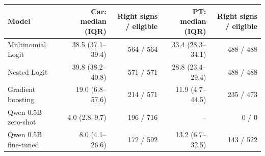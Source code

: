 \begin{tabular}{lrrrr}
\toprule
Model & Car: median (IQR) & Right signs / eligible & PT: median (IQR) & Right signs / eligible \\
\midrule
Multinomial Logit & 38.5 (37.1--39.4) & 564 / 564 & 33.4 (28.3--34.1) & 488 / 488 \\
Nested Logit & 39.8 (38.2--40.8) & 571 / 571 & 28.8 (23.4--29.4) & 488 / 488 \\
Gradient boosting & 19.0 (6.8--57.6) & 214 / 571 & 11.9 (4.7--44.5) & 235 / 473 \\
Qwen 0.5B zero-shot & 4.0 (2.8--9.7) & 196 / 716 & -- & 0 / 0 \\
Qwen 0.5B fine-tuned & 8.0 (4.1--26.6) & 172 / 592 & 13.2 (6.7--32.5) & 143 / 522 \\
\bottomrule
\end{tabular}
